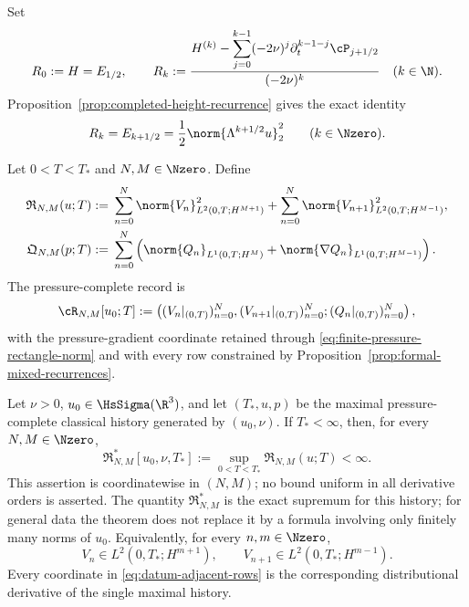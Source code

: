\begin{definition}
\label{def:completed-critical-height-coordinates}
Set
\begin{equation}
 R_0:=H=E_{1/2},
 \qquad
 R_k
 :=\frac{H^{(k)}-
   \displaystyle\sum_{j=0}^{k-1}(-2\nu)^j
   \partial_t^{k-1-j}\cP_{j+1/2}}
 {(-2\nu)^k}
 \quad(k\in\N).
 \label{eq:completed-critical-coordinate}
\end{equation}
Proposition~\ref{prop:completed-height-recurrence} gives the exact identity
\begin{equation}
 R_k=E_{k+1/2}
 =\frac12\norm{\Lambda^{k+1/2}u}_2^2
 \qquad(k\in\Nzero).
 \label{eq:completed-critical-coordinate-identity}
\end{equation}
\end{definition}

\begin{definition}
\label{def:finite-rectangle}
Let \(0<T<T_*\) and \(N,M\in\Nzero\).  Define
\begin{align}
 \mathfrak R_{N,M}(u;T)
 :={}&\sum_{n=0}^{N}
 \norm{V_n}_{L^2(0,T;H^{M+1})}^2
 +\sum_{n=0}^{N}
 \norm{V_{n+1}}_{L^2(0,T;H^{M-1})}^2,
 \label{eq:finite-rectangle-norm}\\
 \mathfrak Q_{N,M}(p;T)
 :={}&\sum_{n=0}^{N}
 \left(
 \norm{Q_n}_{L^1(0,T;H^M)}
 +\norm{\nabla Q_n}_{L^1(0,T;H^{M-1})}
 \right).
 \label{eq:finite-pressure-rectangle-norm}
\end{align}
The pressure-complete record is
\[
 \cR_{N,M}[u_0;T]
 :=\left(
 (V_n|_{(0,T)})_{n=0}^{N},
 (V_{n+1}|_{(0,T)})_{n=0}^{N};
 (Q_n|_{(0,T)})_{n=0}^{N}
 \right),
\]
with the pressure-gradient coordinate retained through
\eqref{eq:finite-pressure-rectangle-norm} and with every row constrained by
Proposition~\ref{prop:formal-mixed-recurrences}.
\end{definition}

\begin{theorem}
\label{thm:datum-rectangles}
Let \(\nu>0\), \(u_0\in\HsSigma(\R^3)\), and let
\((T_*,u,p)\) be the maximal pressure-complete classical history generated
by \((u_0,\nu)\).  If \(T_*<\infty\), then, for every
\(N,M\in\Nzero\),
\begin{equation}
 \mathfrak R_{N,M}^*[u_0,\nu,T_*]
 :=\sup_{0<T<T_*}\mathfrak R_{N,M}(u;T)
 <\infty.
 \label{eq:datum-rectangle-bound}
\end{equation}
This assertion is coordinatewise in \((N,M)\); no bound uniform in all
derivative orders is asserted.  The quantity \(\mathfrak R_{N,M}^*\) is the
exact supremum for this history; for general data the theorem does not replace
it by a formula involving only finitely many norms of \(u_0\).
Equivalently, for every \(n,m\in\Nzero\),
\begin{equation}
 V_n\in L^2(0,T_*;H^{m+1}),
 \qquad
 V_{n+1}\in L^2(0,T_*;H^{m-1}).
 \label{eq:datum-adjacent-rows}
\end{equation}
Every coordinate in \eqref{eq:datum-adjacent-rows} is the corresponding
distributional derivative of the single maximal history.
\end{theorem}

